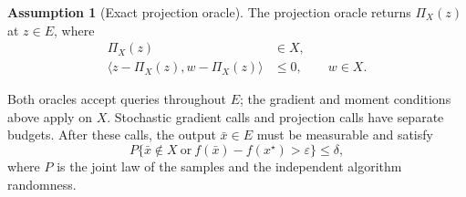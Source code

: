 \documentclass[10pt]{article}
\theoremstyle{definition}
\newtheorem{assumption}{Assumption}
\begin{document}
\begin{assumption}[Exact projection oracle]
The projection oracle returns $\Pi_X(z)$ at $z\in E$, where
\[
\begin{aligned}
\Pi_X(z)&\in X,\\
\langle z-\Pi_X(z),w-\Pi_X(z)\rangle&\leq0,
\qquad w\in X.
\end{aligned}
\]
\end{assumption}

Both oracles accept queries throughout $E$; the gradient and moment conditions above apply on $X$. Stochastic gradient calls and projection calls have separate budgets. After these calls, the output $\bar{x}\in E$ must be measurable and satisfy
\[
P\bigl\{\bar{x}\notin X\ \text{or}\
 f(\bar{x})-f(x^\star)>\varepsilon\bigr\}\leq\delta,
\]
where $P$ is the joint law of the samples and the independent algorithm randomness.
\end{document}
